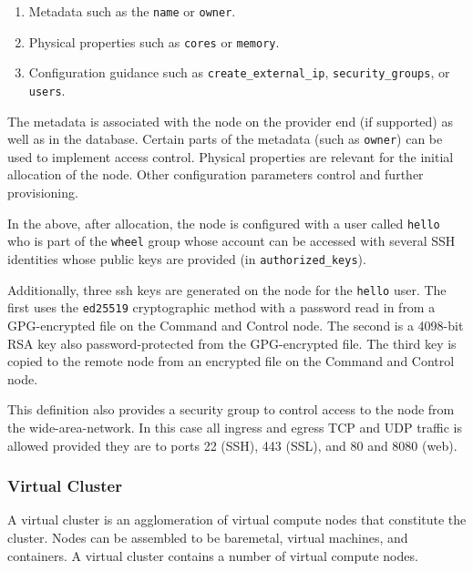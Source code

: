 \documentclass[10pt]{article}
\begin{document}
\begin{enumerate}
\item Metadata such as the \verb|name| or \verb|owner|.
\item Physical properties such as \verb|cores| or \verb|memory|.
\item Configuration guidance such as \verb|create_external_ip|,
  \verb|security_groups|, or \verb|users|.
\end{enumerate}

The metadata is associated with the node on the provider end (if
supported) as well as in the database. Certain parts of the metadata
(such as \verb|owner|) can be used to implement access
control. Physical properties are relevant for the initial allocation
of the node. Other configuration parameters control and further
provisioning.

In the above, after allocation, the node is configured with a user
called \verb|hello| who is part of the \verb|wheel| group whose
account can be accessed with several SSH identities whose public keys
are provided (in \verb|authorized_keys|).

Additionally, three ssh keys are generated on the node for the
\verb|hello| user. The first uses the \verb|ed25519| cryptographic
method with a password read in from a GPG-encrypted file on the
Command and Control node. The second is a 4098-bit RSA key also
password-protected from the GPG-encrypted file. The third key is
copied to the remote node from an encrypted file on the Command and
Control node.

This definition also provides a security group to control access to
the node from the wide-area-network. In this case all ingress and
egress TCP and UDP traffic is allowed provided they are to ports 22
(SSH), 443 (SSL), and 80 and 8080 (web).





\subsubsection{Virtual Cluster}

A virtual cluster is an agglomeration of virtual compute nodes that
constitute the cluster. Nodes can be assembled to be baremetal,
virtual machines, and containers. A virtual cluster contains a number
of virtual compute nodes.  
 
\end{document}
